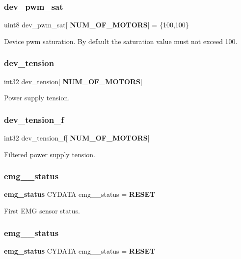 \subsubsection{dev\+\_\+pwm\+\_\+sat}
{\footnotesize\ttfamily uint8 dev\+\_\+pwm\+\_\+sat[\textbf{ N\+U\+M\+\_\+\+O\+F\+\_\+\+M\+O\+T\+O\+RS}] = \{100,100\}}

Device pwm saturation. By default the saturation value must not exceed 100. \mbox{\label{globals_8c_aada869b6650bdd87ca481109ae08231c}} 
\subsubsection{dev\+\_\+tension}
{\footnotesize\ttfamily int32 dev\+\_\+tension[\textbf{ N\+U\+M\+\_\+\+O\+F\+\_\+\+M\+O\+T\+O\+RS}]}

Power supply tension. \mbox{\label{globals_8c_aa2494c7cd8f096ca7f2ead0a1430a597}} 
\subsubsection{dev\+\_\+tension\+\_\+f}
{\footnotesize\ttfamily int32 dev\+\_\+tension\+\_\+f[\textbf{ N\+U\+M\+\_\+\+O\+F\+\_\+\+M\+O\+T\+O\+RS}]}

Filtered power supply tension. \mbox{\label{globals_8c_a433230c4343adf14967e6f4f9082b199}} 
\subsubsection{emg\+\_\+\_\+status}
{\footnotesize\ttfamily \textbf{ emg\+\_\+status} C\+Y\+D\+A\+TA emg\+\_\+\_\+status = \textbf{ R\+E\+S\+ET}}

First E\+MG sensor status. \mbox{\label{globals_8c_a7eef8180f636a73854d52b58e2be4e51}} 
\subsubsection{emg\+\_\+\_\+status}
{\footnotesize\ttfamily \textbf{ emg\+\_\+status} C\+Y\+D\+A\+TA emg\+\_\+\_\+status = \textbf{ R\+E\+S\+ET}}


